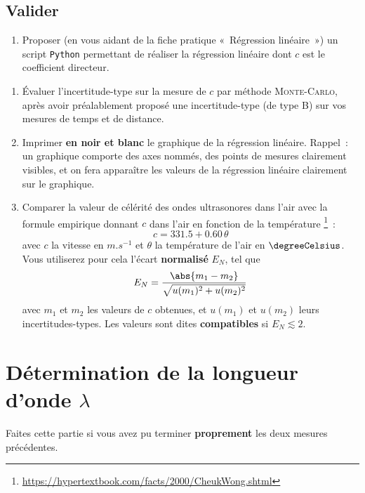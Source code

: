 \documentclass[a4paper, 11pt, final, garamond]{book}
\begin{document}
\subsection{Valider}

\begin{enumerate}[label=\clenumi, resume]
    \item Proposer (en vous aidant de la fiche pratique «~Régression linéaire~»)
        un script \texttt{Python} permettant de réaliser la régression linéaire
        dont $c$ est le coefficient directeur. \bigbreak
\end{enumerate}\vspace{-12pt}
\begin{enumerate}[label=\sqenumi, resume]
    \item Évaluer l'incertitude-type sur la mesure de $c$ par méthode
        \textsc{Monte-Carlo}, après avoir préalablement proposé une
        incertitude-type (de type B) sur vos mesures de temps et de distance.
    \item Imprimer \textbf{en noir et blanc} le graphique de la régression
        linéaire. Rappel~: un graphique comporte des axes nommés, des points de
        mesures clairement visibles, et on fera apparaître les valeurs de la
        régression linéaire clairement sur le graphique.
    \item Comparer la valeur de célérité des ondes ultrasonores dans l'air avec
        la formule empirique donnant $c$ dans l'air en fonction de la
        température
        \footnote{\url{https://hypertextbook.com/facts/2000/CheukWong.shtml}}~:
        \[
            c = \num{331,5} + \num{0,60} \, \theta
        \]
        avec $c$ la vitesse en $\si{m.s^{-1}}$ et $\theta$ la température de l'air en
        $\degreeCelsius$. \bigbreak
        Vous utiliserez pour cela l'écart \textbf{normalisé} $E_N$, tel que
        \[E_N = \frac{\abs{m_1-m_2}}{\sqrt{u(m_1)^2 + u(m_2)^2}}\]
        avec $m_1$ et $m_2$ les valeurs de $c$ obtenues, et $u(m_1)$ et $u(m_2)$
        leurs incertitudes-types. Les valeurs sont dites \textbf{compatibles} si
        $E_N \lesssim 2$.
\end{enumerate}

\section{Détermination de la longueur d'onde $\lambda$}

Faites cette partie si vous avez pu terminer \textbf{proprement} les deux mesures précédentes. 
\end{document}
